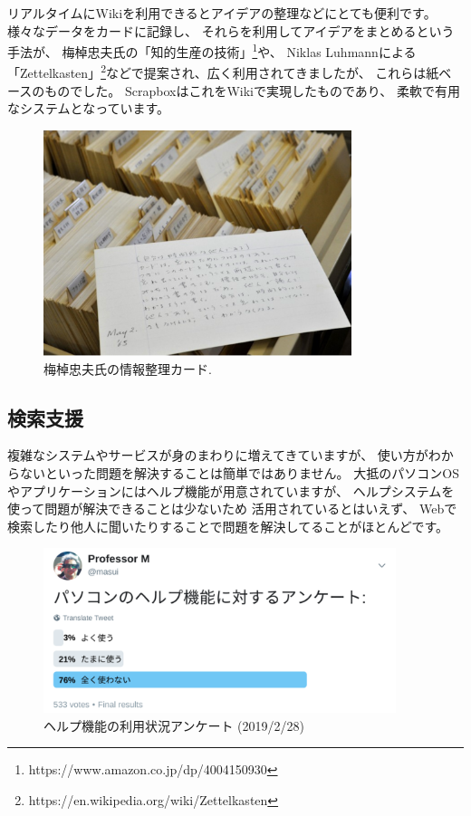 \documentclass[topics]{compsoft} %
\begin{document}
リアルタイムにWikiを利用できるとアイデアの整理などにとても便利です。
様々なデータをカードに記録し、
それらを利用してアイデアをまとめるという手法が、
梅棹忠夫氏の「知的生産の技術」\footnote{
  \textsf{https:{\slash}{\slash}www.amazon.co.jp{\slash}dp{\slash}4004150930}
}や、
Niklas Luhmannによる
「Zettelkasten」\footnote{
  \textsf{https:{\slash}{\slash}en.wikipedia.org{\slash}wiki{\slash}Zettelkasten}
}などで提案され、広く利用されてきましたが、
これらは紙ベースのものでした。
ScrapboxはこれをWikiで実現したものであり、
柔軟で有用なシステムとなっています。

\begin{figure}[t]
  \includegraphics[width=9cm,bb=0 0 1204 882]{figures/1b2d14242e1eb302356a8f49c7450f04.png}
  \caption{梅棹忠夫氏の情報整理カード.}
  \label{umesaocards}
\end{figure}

\subsection{検索支援}

複雑なシステムやサービスが身のまわりに増えてきていますが、
使い方がわからないといった問題を解決することは簡単ではありません。
大抵のパソコンOSやアプリケーションにはヘルプ機能が用意されていますが、
ヘルプシステムを使って問題が解決できることは少ないため
活用されているとはいえず、
Webで検索したり他人に聞いたりすることで問題を解決してることがほとんどです。

\begin{figure}[t]
  \includegraphics[width=10.3cm,bb=0 0 1332 623]{figures/383ee54c265ebbb88778d7ea0fbea5b1.png}
  \caption{ヘルプ機能の利用状況アンケート (2019/2/28)}
  \label{helpinquiry}
\end{figure}
\end{document}
